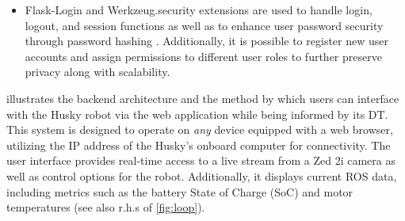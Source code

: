 \documentclass[conference]{IEEEtran}
\begin{document}
\begin{itemize}
\item Flask-Login and Werkzeug.security extensions are used to handle login, logout, and session functions as well as to enhance user password security through password hashing \cite{flasklogin, werkzeug}. Additionally, it is possible to register new user accounts and assign permissions to different user roles to further preserve privacy along with scalability. 
\end{itemize}

 illustrates the backend architecture and the method by which users can interface with the Husky robot via the web application while being informed by its DT. This system is designed to operate on \textit{any} device equipped with a web browser, utilizing the IP address of the Husky's onboard computer for connectivity.
The user interface provides real-time access to a live stream from a Zed 2i camera as well as control options for the robot. Additionally, it displays current ROS data, including metrics such as the battery State of Charge (SoC) and motor temperatures (see also r.h.s of \cref{fig:loop}).
\end{document}
